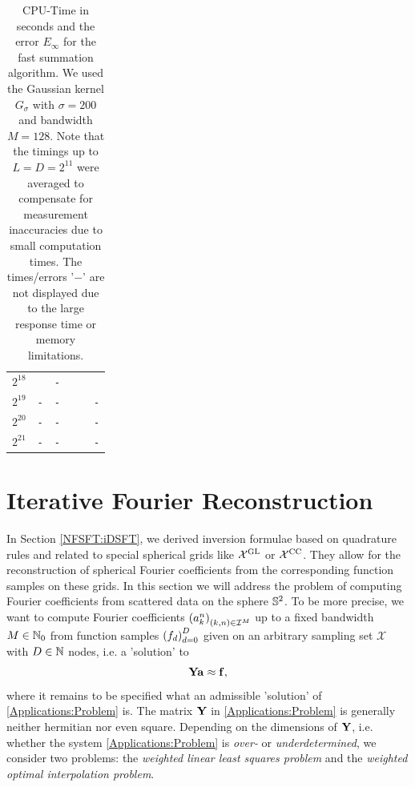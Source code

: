 \begin{table}[h]
\begin{center}
\begin{tabular}{r|r|r|r|r|r}
        $2^{18}$ & \verb#2.6E+04# & \verb#-#       & \verb#4.6E+02# & \verb#7.5E+00# & \verb#1.9E-15# \\
        $2^{19}$ & \verb#-#       & \verb#-#       & \verb#9.1E+02# & \verb#1.4E+01# & \verb#-# \\
        $2^{20}$ & \verb#-#       & \verb#-#       & \verb#1.8E+03# & \verb#2.8E+01# & \verb#-# \\
        $2^{21}$ & \verb#-#       & \verb#-#       & \verb#3.6E+03# & \verb#5.5E+01# & \verb#-# \\
    \end{tabular}
  \end{center}
  \caption{CPU-Time in seconds and the error $E_{\infty}$ for the fast summation algorithm. We used 
    the Gaussian kernel $G_{\sigma}$ with $\sigma=200$ and bandwidth $M = 128$. Note that the timings 
    up to $L=D=2^{11}$ were
    averaged to compensate for measurement inaccuracies due to small computation times. The
    times/errors '$-$' are not displayed due to the large response time or memory limitations.}
  \label{tab:TimeSpace}
\end{table}


\section{Iterative Fourier Reconstruction}

In Section \ref{NFSFT:iDSFT}, we derived
inversion formulae based on quadrature rules and related to special spherical 
grids like $\mathcal{X^{\mbox{\scriptsize\rm{GL}}}}$ or $\mathcal{X^{\mbox{\scriptsize\rm{CC}}}}$. They allow for the 
reconstruction of spherical Fourier coefficients from the corresponding
function samples on these grids.
In this section we will address the problem of computing Fourier coefficients from
scattered data on the sphere $\mathbb{S}^2$. To be more precise, we want to compute 
Fourier coefficients $\left(a_{k}^n\right)_{(k,n) \in \mathcal{I}^M}$ up to a fixed 
bandwidth $M \in \mathbb{N}_{0}$ from function samples $\left(f_{d}\right)_{d=0}^D$ given on an
arbitrary sampling set $\mathcal{X}$ with $D \in \mathbb{N}$ nodes, i.e. a 'solution' to
\begin{equation}
  \label{Applications:Problem}
  \mathbf{Y} \mathbf{a} \approx \mathbf{f},
\end{equation}
where it remains to be specified what an admissible 'solution' of 
\eqref{Applications:Problem} is.
The matrix $\mathbf{Y}$ in \eqref{Applications:Problem} is generally 
neither hermitian nor even square. Depending on the dimensions of $\mathbf{Y}$, i.e.
whether the system \eqref{Applications:Problem} is \emph{over-} or 
\emph{underdetermined}, we consider two problems: the 
\emph{weighted linear least squares problem} and the
\emph{weighted optimal interpolation problem}.

